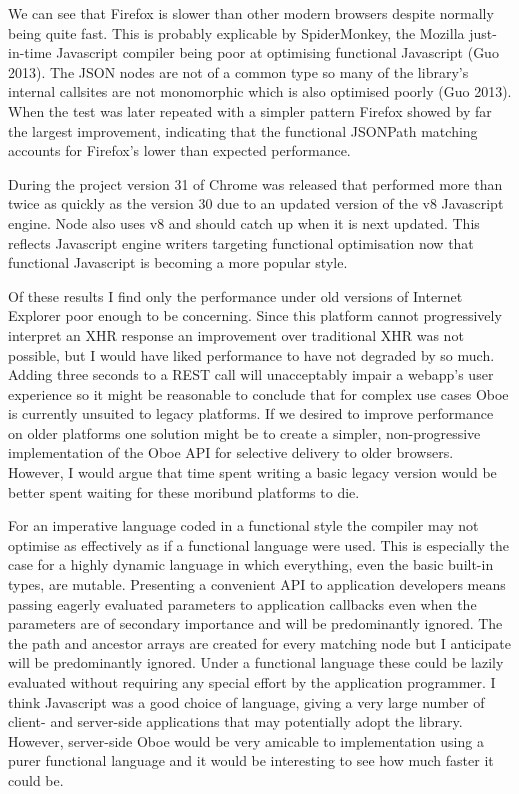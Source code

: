 \documentclass[]{article}
\begin{document}
We can see that Firefox is slower than other modern browsers despite
normally being quite fast. This is probably explicable by SpiderMonkey,
the Mozilla just-in-time Javascript compiler being poor at optimising
functional Javascript (Guo 2013). The JSON nodes are not of a common
type so many of the library's internal callsites are not monomorphic
which is also optimised poorly (Guo 2013). When the test was later
repeated with a simpler pattern Firefox showed by far the largest
improvement, indicating that the functional JSONPath matching accounts
for Firefox's lower than expected performance.

During the project version 31 of Chrome was released that performed more
than twice as quickly as the version 30 due to an updated version of the
v8 Javascript engine. Node also uses v8 and should catch up when it is
next updated. This reflects Javascript engine writers targeting
functional optimisation now that functional Javascript is becoming a
more popular style.

Of these results I find only the performance under old versions of
Internet Explorer poor enough to be concerning. Since this platform
cannot progressively interpret an XHR response an improvement over
traditional XHR was not possible, but I would have liked performance to
have not degraded by so much. Adding three seconds to a REST call will
unacceptably impair a webapp's user experience so it might be reasonable
to conclude that for complex use cases Oboe is currently unsuited to
legacy platforms. If we desired to improve performance on older
platforms one solution might be to create a simpler, non-progressive
implementation of the Oboe API for selective delivery to older browsers.
However, I would argue that time spent writing a basic legacy version
would be better spent waiting for these moribund platforms to die.

For an imperative language coded in a functional style the compiler may
not optimise as effectively as if a functional language were used. This
is especially the case for a highly dynamic language in which
everything, even the basic built-in types, are mutable. Presenting a
convenient API to application developers means passing eagerly evaluated
parameters to application callbacks even when the parameters are of
secondary importance and will be predominantly ignored. The the path and
ancestor arrays are created for every matching node but I anticipate
will be predominantly ignored. Under a functional language these could
be lazily evaluated without requiring any special effort by the
application programmer. I think Javascript was a good choice of
language, giving a very large number of client- and server-side
applications that may potentially adopt the library. However,
server-side Oboe would be very amicable to implementation using a purer
functional language and it would be interesting to see how much faster
it could be.
\end{document}
